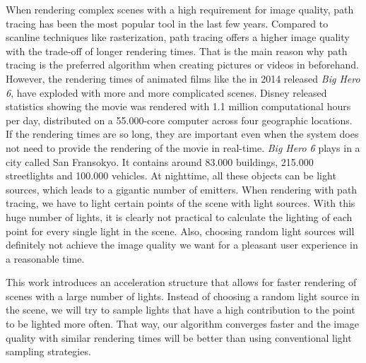 
\Abstract

When rendering complex scenes with a high requirement for image quality, path tracing has been the most popular tool in the last few years. Compared to scanline techniques like rasterization, path tracing offers a higher image quality with the trade-off of longer rendering times. That is the main reason why path tracing is the preferred algorithm when creating pictures or videos in beforehand. However, the rendering times of animated films like the in 2014 released \textit{Big Hero 6}, have exploded with more and more complicated scenes. Disney released statistics showing the movie was rendered with 1.1 million computational hours per day, distributed on a 55.000-core computer across four geographic locations. If the rendering times are so long, they are important even when the system does not need to provide the rendering of the movie in real-time. \textit{Big Hero 6} plays in a city called San Fransokyo. It contains around 83.000 buildings, 215.000 streetlights and 100.000 vehicles. At nighttime, all these objects can be light sources, which leads to a gigantic number of emitters. When rendering with path tracing, we have to light certain points of the scene with light sources. With this huge number of lights, it is clearly not practical to calculate the lighting of each point for every single light in the scene. Also, choosing random light sources will definitely not achieve the image quality we want for a pleasant user experience in a reasonable time. \cite{BH6}

This work introduces an acceleration structure that allows for faster rendering of scenes with a large number of lights. Instead of choosing a random light source in the scene, we will try to sample lights that have a high contribution to the point to be lighted more often. That way, our algorithm converges faster and the image quality with similar rendering times will be better than using conventional light sampling strategies.